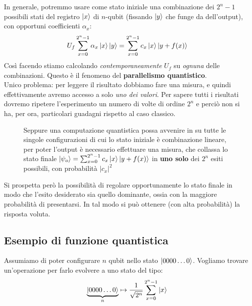 \documentclass[../../InformazioneQuantistica.tex]{subfiles}
\begin{document}
In generale, potremmo usare come stato iniziale una combinazione dei $2^n-1$ possibili stati del registro $\Ket{x}$ di $n$-qubit (fissando $\Ket{y}$ che funge da  dell'output), con opportuni coefficienti $\alpha_x$:
\begin{align*}
U_f \sum_{x=0}^{2^n-1} \alpha_x \Ket{x}\Ket{y} = \sum_{x=0}^{2^n-1} c_x \Ket{x}\Ket{y+ f(x)}
\end{align*}
Così facendo stiamo calcolando \textit{contemporaneamente} $U_f$ su \textit{ognuna} delle combinazioni. Questo è il fenomeno del \textbf{parallelismo quantistico}.\\
Unico problema: per leggere il risultato dobbiamo fare una misura, e quindi effettivamente avremo accesso a solo \textit{uno dei valori}. Per sapere tutti i risultati dovremo ripetere l'esperimento un numero di volte di ordine $2^n$ e perciò non si ha, per ora, particolari guadagni rispetto al caso classico.\\

\begin{figure}[H]
\centering

\caption{Seppure una computazione quantistica possa avvenire in  su tutte le singole configurazioni di cui lo stato iniziale è combinazione lineare, per poter  l'output è necessario effettuare una misura, che collassa lo stato finale $\Ket{\psi_o} = \sum_{x=0}^{2^n-1}c_x \Ket{x}\Ket{y+f(x)}$ in \textbf{uno solo} dei $2^n$ esiti possibili, con probabilità $|c_x|^2$\label{fig:quantum-parallelism}}
\end{figure}

Si prospetta però la possibilità di regolare opportunamente lo stato finale in modo che l'esito desiderato sia quello dominante, ossia con la maggiore probabilità di presentarsi. In tal modo si può ottenere (con alta probabilità) la risposta voluta.

\subsection{Esempio di funzione quantistica}
Assumiamo di poter configurare $n$ qubit nello stato $\Ket{0000\dots0}$. Vogliamo trovare un'operazione per farlo evolvere a uno stato del tipo:
\begin{align*}
\underbrace{\Ket{0000\dots0}}_{n} \mapsto \frac{1}{\sqrt{2^n}} \sum_{x=0}^{2^n-1} \Ket{x}
\end{align*}
\end{document}
